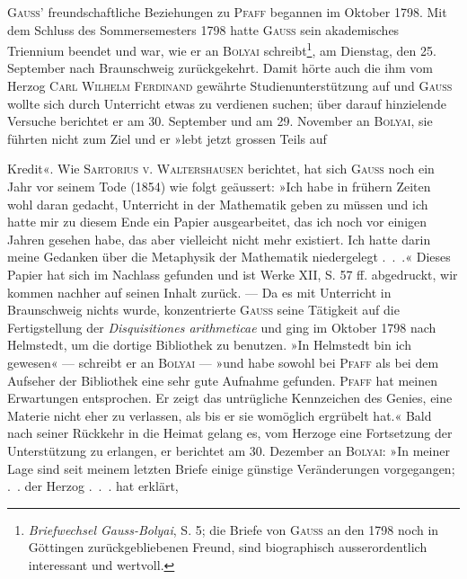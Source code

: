 \bigskip
\begin{center}\end{center}
\indent \textsc{Gauss’} freundschaftliche Beziehungen zu \textsc{Pfaff} begannen im Oktober 1798.
Mit dem Schluss des Sommersemesters 1798 hatte \textsc{Gauss} sein akademisches
Triennium beendet und war, wie er an \textsc{Bolyai} schreibt\footnote{\textit{Briefwechsel Gauss-Bolyai}, S. 5; die Briefe von \textsc{Gauss} an den 1798 noch in Göttingen zurückgebliebenen Freund, sind biographisch ausserordentlich interessant und wertvoll.}, am Dienstag, den
25. September nach Braunschweig zurückgekehrt. Damit hörte auch die ihm
vom Herzog \textsc{Carl Wilhelm Ferdinand} gewährte Studienunterstützung auf und
\textsc{Gauss} wollte sich durch Unterricht etwas zu verdienen suchen; über darauf
hinzielende Versuche berichtet er am 30. September und am 29. November
an \textsc{Bolyai}, sie führten nicht zum Ziel und er »lebt jetzt grossen Teils auf\par
\clearpage{}
\noindent Kredit«. Wie \textsc{Sartorius v. Waltershausen} berichtet, hat sich \textsc{Gauss} noch ein
Jahr vor seinem Tode (1854) wie folgt geäussert: »Ich habe in frühern Zeiten
wohl daran gedacht, Unterricht in der Mathematik geben zu müssen und ich
hatte mir zu diesem Ende ein Papier ausgearbeitet, das ich noch vor einigen
Jahren gesehen habe, das aber vielleicht nicht mehr existiert. Ich hatte darin
meine Gedanken über die Metaphysik der Mathematik niedergelegt .\ .\ .« Dieses
Papier hat sich im Nachlass gefunden und ist Werke XII, S. 57 ff. abgedruckt,
wir kommen nachher auf seinen Inhalt zurück. — Da es mit Unterricht in
Braunschweig nichts wurde, konzentrierte \textsc{Gauss} seine Tätigkeit auf die
Fertigstellung der \textit{Disquisitiones arithmeticae} und ging im Oktober 1798 nach
Helmstedt, um die dortige Bibliothek zu benutzen. »In Helmstedt bin
ich gewesen« — schreibt er an \textsc{Bolyai} — »und habe sowohl bei \textsc{Pfaff}
als bei dem Aufseher der Bibliothek eine sehr gute Aufnahme gefunden.
\textsc{Pfaff} hat meinen Erwartungen entsprochen. Er zeigt das untrügliche Kennzeichen
des Genies, eine Materie nicht eher zu verlassen, als bis er sie womöglich
ergrübelt hat.« Bald nach seiner Rückkehr in die Heimat gelang
es, vom Herzoge eine Fortsetzung der Unterstützung zu erlangen, er berichtet
am 30. Dezember an \textsc{Bolyai}: »In meiner Lage sind seit meinem letzten Briefe
einige günstige Veränderungen vorgegangen; .\ . der Herzog .\ .\ . hat erklärt,
